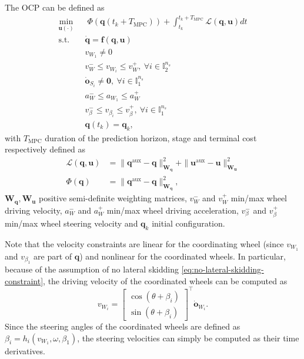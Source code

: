 The OCP can be defined as 
\begin{equation*}
    \begin{aligned}
        \min_{\bm{u}(\cdot)} \;\;
            & \; \Phi(\bm{q}(t_k + T_{\mathrm{MPC}})) + \int_{t_k}^{t_k + T_{\mathrm{MPC}}} \mathcal{L}(\bm{q}, \bm{u}) dt \\
            \text{s.t. } & \dot{\bm{q}} = \bm{f}(\bm{q}, \bm{u}) \\
                         & v_{W_1} \ne 0 \\
                         & v_W^- \le v_{W_i} \le v_W^+,\:  \forall i \in \mathbb{I}_2^{n_s} \\
                         & \dot{\bm{o}}_{S_i} \ne \bm{0},\: \forall i \in \mathbb{I}_1^{n_s} \\
                         & a_W^- \le a_{W_1} \le a_W^+ \\
                         & v_{\beta}^- \le v_{\beta_i} \le v_{\beta}^+,\: \forall i \in \mathbb{I}_1^{n_s} \\
                         & \bm{q}(t_k) = \bm{q}_k,
    \end{aligned}
\end{equation*}
with $T_{\mathrm{MPC}}$ duration of the prediction horizon, stage and terminal
cost respectively defined as
\begin{align*}
    \mathcal{L}(\bm{q}, \bm{u}) &= \|\bm{q}^{\mathrm{aux}} - \bm{q}\|_{\bm{W_q}}^2 + \|\bm{u}^{\mathrm{aux}} - \bm{u}\|_{\bm{W_u}}^2 \\
    \Phi(\bm{q}) &= \|\bm{q}^{\mathrm{aux}} - \bm{q}\|_{\bm{W_q}}^2,
\end{align*}
$\bm{W_q}, \bm{W_u}$ positive semi-definite weighting matrices, $v_W^-$ and
$v_W^+$ min/max wheel driving velocity, $a_W^-$ and $a_W^+$ min/max wheel
driving acceleration, $v_{\beta}^-$ and $v_{\beta}^+$  min/max  wheel steering
velocity and $\bm{q}_k$ initial configuration.

Note that the velocity constraints are linear for the coordinating wheel
(since $v_{W_1}$ and $v_{\beta_1}$ are part of $\bm{q}$) and nonlinear for the
coordinated wheels. In particular, because of the assumption of no lateral
skidding \eqref{eq:no-lateral-skidding-constraint}, the driving velocity of
the coordinated wheels can be computed as
\begin{equation*}
    v_{W_i} = 
    \begin{bmatrix}
        \cos(\theta + \beta_i) \\
        \sin(\theta + \beta_i)
    \end{bmatrix}^\top \dot{\bm{o}}_{W_i}.
\end{equation*}
Since the steering angles of the coordinated wheels are defined as
$\beta_i=h_i(v_{W_1}, \omega, \beta_1)$, the steering velocities can simply be
computed as their time derivatives.

